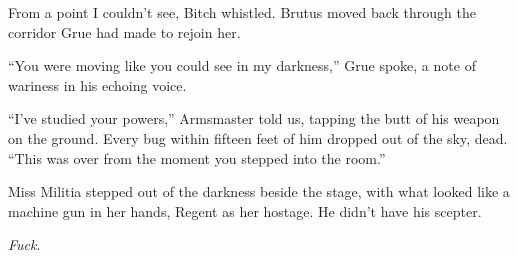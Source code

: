 From a point I couldn't see, Bitch whistled.  Brutus moved back through the corridor Grue had made to rejoin her.



``You were moving like you could see in my darkness,'' Grue spoke, a note of wariness in his echoing voice.



``I've studied your powers,'' Armsmaster told us, tapping the butt of his weapon on the ground.  Every bug within fifteen feet of him dropped out of the sky, dead.  ``This was over from the moment you stepped into the room.''



Miss Militia stepped out of the darkness beside the stage, with what looked like a machine gun in her hands, Regent as her hostage.  He didn't have his scepter.



\emph{Fuck}.





